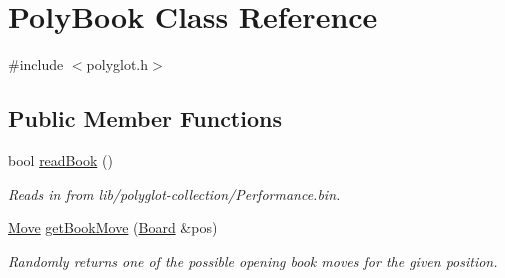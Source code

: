 \hypertarget{classPolyBook}{}\section{Poly\+Book Class Reference}
\label{classPolyBook}


{\ttfamily \#include $<$polyglot.\+h$>$}

\subsection*{Public Member Functions}
\begin{DoxyCompactItemize}
\item 
bool \mbox{\hyperlink{classPolyBook_ac9eaa321dd857646c059b84aa67f5c9b}{read\+Book}} ()
\begin{DoxyCompactList}\small\item\em Reads in from lib/polyglot-\/collection/\+Performance.\+bin. \end{DoxyCompactList}\item 
\mbox{\hyperlink{classMove}{Move}} \mbox{\hyperlink{classPolyBook_a594d060bcb84f4d6cd3999ca4698f847}{get\+Book\+Move}} (\mbox{\hyperlink{classBoard}{Board}} \&pos)
\begin{DoxyCompactList}\small\item\em Randomly returns one of the possible opening book moves for the given position. \end{DoxyCompactList}\end{DoxyCompactItemize}
